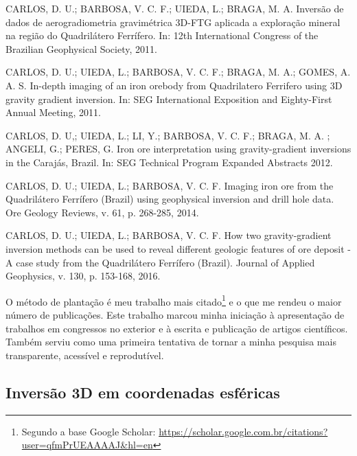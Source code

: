 \documentclass[12pt,a4paper,oneside,titlepage,onecolumn]{article}
\begin{document}
\begin{displayquote}
    CARLOS, D. U.; BARBOSA, V. C. F.; UIEDA, L.; BRAGA, M. A. Inversão de
    dados de aerogradiometria gravimétrica 3D-FTG aplicada a exploração mineral
    na região do Quadrilátero Ferrífero. In: 12th International Congress of the
    Brazilian Geophysical Society, 2011.
\end{displayquote}

\begin{displayquote}
    CARLOS, D. U.; UIEDA, L.; BARBOSA, V. C. F.; BRAGA,
    M. A.; GOMES, A. A. S. In-depth imaging of an iron
    orebody from Quadrilatero Ferrifero using 3D gravity gradient inversion.
    In: SEG International Exposition and Eighty-First Annual Meeting, 2011.
\end{displayquote}

\begin{displayquote}
    CARLOS, D. U,; UIEDA, L.; LI, Y.; BARBOSA, V.
    C. F.; BRAGA, M. A. ; ANGELI, G.; PERES, G. Iron ore
    interpretation using gravity-gradient inversions in the Carajás, Brazil.
    In: SEG Technical Program Expanded Abstracts 2012.
\end{displayquote}

\begin{displayquote}
    CARLOS, D. U.; UIEDA, L.; BARBOSA, V. C. F. Imaging
    iron ore from the Quadrilátero Ferrífero (Brazil) using geophysical
    inversion and drill hole data. Ore Geology Reviews, v. 61, p. 268-285,
    2014.
\end{displayquote}

\begin{displayquote}
    CARLOS, D. U.; UIEDA, L.; BARBOSA, V. C. F. How two
    gravity-gradient inversion methods can be used to reveal different geologic
    features of ore deposit - A case study from the Quadrilátero Ferrífero
    (Brazil). Journal of Applied Geophysics, v. 130, p. 153-168, 2016.
\end{displayquote}


O método de plantação \citep{seed} é meu trabalho mais citado\footnote{Segundo
a base Google Scholar:
\url{https://scholar.google.com.br/citations?user=qfmPrUEAAAAJ&hl=en}} e o que
me rendeu o maior número de publicações.
Este trabalho marcou minha iniciação
à apresentação de trabalhos em congressos no exterior e
à escrita e publicação de artigos científicos.
Também serviu como uma primeira tentativa de tornar a minha pesquisa mais
transparente, acessível e reprodutível.


\subsection{Inversão 3D em coordenadas esféricas}
\end{document}

